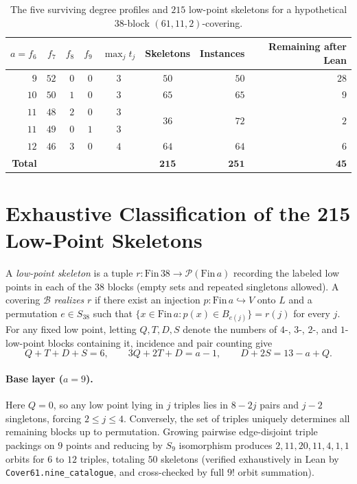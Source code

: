 \documentclass[11pt,a4paper]{article}
\theoremstyle{definition}
\theoremstyle{remark}
\begin{document}
\begin{table}[t]
\centering
\caption{The five surviving degree profiles and $215$ low-point skeletons for a hypothetical $38$-block $(61,11,2)$-covering.}
\label{tab:profiles}
\small
\begin{tabular}{@{}rrrrccrr@{}}
\toprule
$a = f_6$ & $f_7$ & $f_8$ & $f_9$ & $\max_j t_j$ & Skeletons & Instances & Remaining after Lean \\
\midrule
$9$  & $52$ & $0$ & $0$ & $3$ & $50$ & $50$ & $28$ \\
$10$ & $50$ & $1$ & $0$ & $3$ & $65$ & $65$ & $9$  \\
$11$ & $48$ & $2$ & $0$ & $3$ & \multirow{2}{*}{$36$} & \multirow{2}{*}{$72$} & \multirow{2}{*}{$2$} \\
$11$ & $49$ & $0$ & $1$ & $3$ & & & \\
$12$ & $46$ & $3$ & $0$ & $4$ & $64$ & $64$ & $6$  \\
\midrule
\textbf{Total} & & & & & $\mathbf{215}$ & $\mathbf{251}$ & $\mathbf{45}$ \\
\bottomrule
\end{tabular}
\end{table}

\section{Exhaustive Classification of the 215 Low-Point Skeletons}\label{sec:skeletons}

A \emph{low-point skeleton} is a tuple $r : \mathrm{Fin}\,38 \to \mathcal{P}(\mathrm{Fin}\,a)$ recording the labeled low points in each of the $38$ blocks (empty sets and repeated singletons allowed). A covering $\mathcal{B}$ \emph{realizes} $r$ if there exist an injection $p : \mathrm{Fin}\,a \hookrightarrow V$ onto $L$ and a permutation $e \in S_{38}$ such that $\{x \in \mathrm{Fin}\,a : p(x) \in B_{e(j)}\} = r(j)$ for every $j$. For any fixed low point, letting $Q, T, D, S$ denote the numbers of $4$-, $3$-, $2$-, and $1$-low-point blocks containing it, incidence and pair counting give
\begin{equation}\label{eq:sk_deg}
  Q + T + D + S = 6, \qquad 3Q + 2T + D = a - 1, \qquad D + 2S = 13 - a + Q.
\end{equation}

\paragraph{Base layer ($a = 9$).}
Here $Q = 0$, so any low point lying in $j$ triples lies in $8 - 2j$ pairs and $j - 2$ singletons, forcing $2 \le j \le 4$. Conversely, the set of triples uniquely determines all remaining blocks up to permutation. Growing pairwise edge-disjoint triple packings on $9$ points and reducing by $S_9$ isomorphism produces $2, 11, 20, 11, 4, 1, 1$ orbits for $6$ to $12$ triples, totaling $50$ skeletons (verified exhaustively in Lean by \texttt{Cover61.nine\_catalogue}, and cross-checked by full $9!$ orbit summation).
\end{document}
